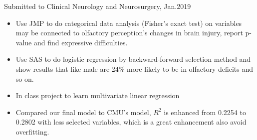 \documentclass{resume}
\begin{document}
Submitted to Clinical Neurology and Neurosurgery, Jan.2019
\begin{itemize}
   \item Use JMP to do categorical data analysis (Fisher's exact test) on variables may be connected to olfactory perception's changes in brain injury, report p-value and find expressive difficulties.
  \item Use SAS to do logistic regression by backward-forward selection method and show results that like male are 24\% more likely to be in olfactory deficits and so on.
\end{itemize}

\begin{itemize}
  \item In class project to learn multivariate linear regression
  \item Compared our final model to CMU's model, $R^{2}$ is enhanced from 0.2254 to 0.2802 with less selected variables, which is a great enhancement also avoid overfitting.
\end{itemize}



%
%
\end{document}
